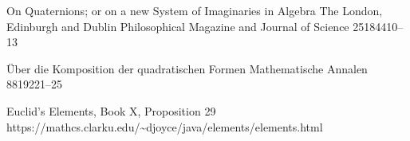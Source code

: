 \documentclass[12pt,table]{article}
\theoremstyle{definition}
\theoremstyle{remark}
\numberwithin{equation}{section}
\begin{document}
\begin{thebibliography}{1}
\begin{comment}
\bibitem{Guzeltepe}
\journal{M.\ G\"uzeltepe}
        {Codes over Hurwitz integers}
        {Discrete Math.}
        {313}{2013}{704--714}



\bibitem{Halai}
\article{C.\ Halai}
      {Triples and Quadruples: From Pythagoras to Fermat}
      {plus.maths.org/ content/triples-and-quadruples}{}


\end{comment}

        {On Quaternions; or on a new System of Imaginaries in Algebra}
        {The London, Edinburgh and Dublin Philosophical Magazine
         and Journal of Science}
        {25}{1844}{10--13}

\begin{comment}

\bibitem{Hardy_and_Wright}
\book{G.\ H.\ Hardy and E.\ M.\ Wright}
         {An Introduction to the Theory of Numbers, 6th Edition}
         {Oxford University Press, Oxford} 
         {2008}




\bibitem{Hatcher}
\book{A.\ Hatcher}
         {Topology of Numbers}
         {Manuscript}
         {February 2018 version}



\bibitem{Heath}
\book{T.\ L.\ Heath}
     {Diophantus of Alexandria, 2nd Edition}
     {Cambridge University Press, London}
     {1910}



\end{comment}


        {\"Uber die Komposition der quadratischen Formen}
        {Mathematische Annalen}
        {88}{1922}{1--25}

\begin{comment}

\bibitem{Jacobi}
\journal{C.\ G.\ J.\ Jacobi}
        {De compositione numerorum e quatuor quadratis}
        {Journal f\"ur die reine und angewandte Mathematik}
        {12}{1834}{167--172}

\end{comment}


        {Euclid's Elements, Book X, Proposition 29}
        {\\https://mathcs.clarku.edu/\~{}djoyce/java/elements/elements.html}



\begin{comment}


\end{comment}
\end{thebibliography}
\end{document}
